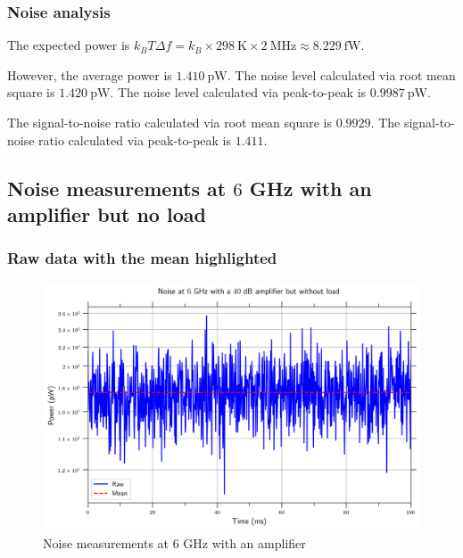 \documentclass[english,12pt,a4paper]{article}
\begin{document}
 

\hypertarget{noise-analysis}{%
	\subsubsection{Noise analysis}\label{noise-analysis_2}}

	The expected power is $k_B T\Delta f = k_B \times \qty{298}{\kelvin} \times \qty{2}{\mega\hertz} \approx \qty{8.229}{\femto\watt}$.
	
	However, the average power is $\qty{1.410}{\pico\watt}$.
	The noise level calculated via root mean square is $\qty{1.420}{\pico\watt}$.
	The noise level calculated via peak-to-peak is $\qty{0.9987}{\pico\watt}$.
	
	The signal-to-noise ratio calculated via root mean square is $0.9929$.
	The signal-to-noise ratio calculated via peak-to-peak is $1.411$.

\hypertarget{noise-measurements-at-6-ghz-with-an-amplifier-but-no-load}{%
	\subsection{\texorpdfstring{Noise measurements at \(6\) GHz with an
			amplifier but no
			load}{Noise measurements at 6 GHz with an amplifier but no load}}\label{noise-measurements-at-6-ghz-with-an-amplifier-but-no-load}}


\hypertarget{raw-data-with-the-mean-highlighted}{%
	\subsubsection{Raw data with the mean
		highlighted}\label{raw-data-with-the-mean-highlighted_2}}

\begin{figure}[H]
	\includegraphics[width=1\linewidth]{Plots/noise_floor_6_GHz_amplif}
	\caption{Noise measurements at 6 GHz with an amplifier}
	\label{fig:noisefloor6ghzamplif}
\end{figure}
 
\end{document}
